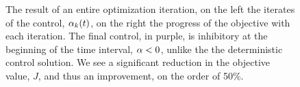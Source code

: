 \documentclass{article}
\begin{document}
\begin{figure}[h]
\begin{center}
\caption[ ]{The result of an entire optimization iteration, on the left the
iterates of the control, ${\alpha}_k(t)$, on the right the progress of the
objective with each iteration. The final control, in purple, is inhibitory at
the beginning of the time interval, ${\alpha} < 0$, unlike the the deterministic
control solution. 
We see a significant
reduction in the objective value, $J$, and thus an improvement, on the
order of 50\%.}
\label{fig:FP_adjoint_objective_control_convergence}
\end{center}
\end{figure}
\end{document}
